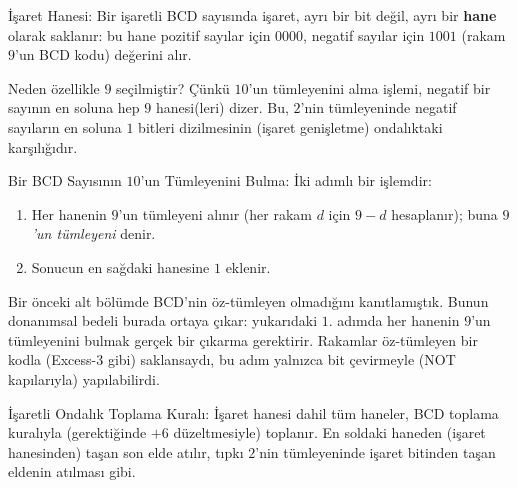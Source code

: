 \begin{tanim}{İşaret Hanesi:}
Bir işaretli BCD sayısında işaret, ayrı bir bit değil, ayrı bir \textbf{hane} olarak
saklanır: bu hane pozitif sayılar için $0000$, negatif sayılar için $1001$ (rakam $9$'un
BCD kodu) değerini alır.
\end{tanim}

Neden özellikle $9$ seçilmiştir? Çünkü $10$'un tümleyenini alma işlemi, negatif bir sayının
en soluna hep $9$ hanesi(leri) dizer. Bu, $2$'nin tümleyeninde negatif sayıların en soluna
$1$ bitleri dizilmesinin (işaret genişletme) ondalıktaki karşılığıdır.

\begin{tanim}{Bir BCD Sayısının $10$'un Tümleyenini Bulma:}
İki adımlı bir işlemdir:
\begin{enumerate}[nosep, leftmargin=*]
    \item Her hanenin $9$'un tümleyeni alınır (her rakam $d$ için $9-d$ hesaplanır); buna
    \emph{$9$'un tümleyeni} denir.
    \item Sonucun en sağdaki hanesine $1$ eklenir.
\end{enumerate}
\end{tanim}

\begin{bilginot}
Bir önceki alt bölümde BCD'nin öz-tümleyen olmadığını kanıtlamıştık. Bunun donanımsal
bedeli burada ortaya çıkar: yukarıdaki $1$. adımda her hanenin $9$'un tümleyenini bulmak
gerçek bir çıkarma gerektirir. Rakamlar öz-tümleyen bir kodla (Excess-3 gibi) saklansaydı,
bu adım yalnızca bit çevirmeyle (NOT kapılarıyla) yapılabilirdi.
\end{bilginot}

\begin{tanim}{İşaretli Ondalık Toplama Kuralı:}
İşaret hanesi dahil tüm haneler, BCD toplama kuralıyla (gerektiğinde $+6$ düzeltmesiyle)
toplanır. En soldaki haneden (işaret hanesinden) taşan son elde atılır, tıpkı $2$'nin
tümleyeninde işaret bitinden taşan eldenin atılması gibi.
\end{tanim}

